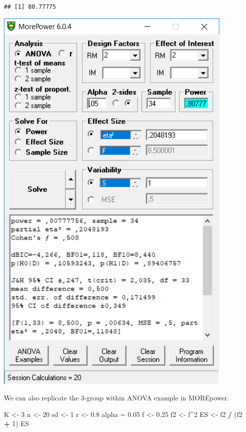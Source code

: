 \documentclass[
]{book}
\newenvironment{Shaded}{\begin{snugshade}}{\end{snugshade}}
\newcommand{\DecValTok}[1]{\textcolor[rgb]{0.00,0.00,0.81}{#1}}
\newcommand{\FloatTok}[1]{\textcolor[rgb]{0.00,0.00,0.81}{#1}}
\newcommand{\NormalTok}[1]{#1}
\newcommand{\OperatorTok}[1]{\textcolor[rgb]{0.81,0.36,0.00}{\textbf{#1}}}
\newcommand{\StringTok}[1]{\textcolor[rgb]{0.31,0.60,0.02}{#1}}
\begin{document}
\begin{Shaded}
\end{Shaded}

\begin{verbatim}
## [1] 80.77775
\end{verbatim}

\includegraphics{screenshots/morepower_2.png}

We can also replicate the 3-group within ANOVA example in MOREpower.

\begin{Shaded}
\begin{Highlighting}[]
\NormalTok{K <-}\StringTok{ }\DecValTok{3}
\NormalTok{n <-}\StringTok{ }\DecValTok{20}
\NormalTok{sd <-}\StringTok{ }\DecValTok{1}
\NormalTok{r <-}\StringTok{ }\FloatTok{0.8}
\NormalTok{alpha =}\StringTok{ }\FloatTok{0.05}
\NormalTok{f <-}\StringTok{ }\FloatTok{0.25}
\NormalTok{f2 <-}\StringTok{ }\NormalTok{f}\OperatorTok{^}\DecValTok{2}
\NormalTok{ES <-}\StringTok{ }\NormalTok{f2 }\OperatorTok{/}\StringTok{ }\NormalTok{(f2 }\OperatorTok{+}\StringTok{ }\DecValTok{1}\NormalTok{)}
\NormalTok{ES}
\end{Highlighting}
\end{Shaded}
\end{document}
